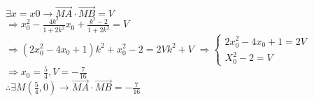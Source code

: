 \begin{minipage}[b][19cm][t]{\textwidth}
\begin{large}
$\exists x=x0 \rightarrow \vec{MA}\cdot\vec{MB}=V$\hspace{1cm}\\
$\Rightarrow x_0^2-\frac{4k^2}{1+2k^2}x_0+\frac{k^2-2}{1+2k^2}=V$\\
$\Rightarrow (2x_0^2-4x_0+1)k^2+x_0^2-2=2Vk^2+V$
$\Rightarrow \begin{cases}
  2x_0^2-4x_0+1 = 2V \\
  X_0^2-2=V
\end{cases}$ $\Rightarrow x_0=\frac{5}{4},V=-\frac{7}{16}$\\
$\therefore \exists M(\frac{5}{4},0) \rightarrow \vec{MA}\cdot\vec{MB}=-\frac{7}{16}$
\end{large}
\end{minipage}
